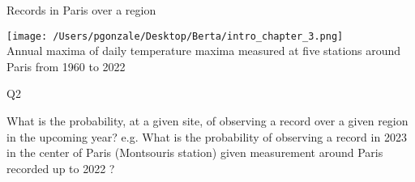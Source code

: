 \documentclass[9pt,compress]{beamer}
\begin{document}
\begin{frame}{Records in Paris over a region}
\begin{center}
\texttt{[image: /Users/pgonzale/Desktop/Berta/intro\_chapter\_3.png]}\\
{\tiny Annual maxima of daily temperature maxima measured at {\color{red} five} stations  around Paris from 1960 to 2022}
 \end{center}    \pause
  
\end{frame}
%
%
%
%
%
%
\begin{frame}{Q2}
\begin{center}
{\LARGE{\color{beamer@blendedblue}What is the probability, at a given site, of observing a record over a given region in the upcoming year?}}
\vfill
e.g. What is the probability of observing a record in 2023 in the center of Paris (Montsouris station) given measurement around  Paris recorded up to 2022 ?
\end{center}
\end{frame}
%
%
%
\end{document}
